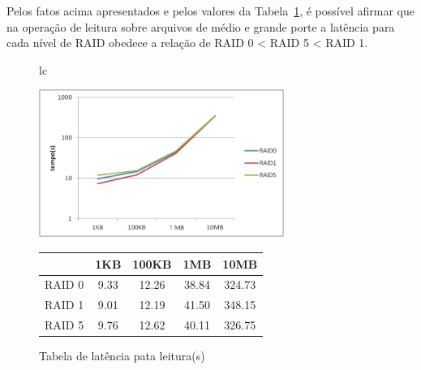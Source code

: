 	Pelos fatos acima apresentados e pelos valores da Tabela~\ref{tab:latencia_l}, é possível afirmar que na operação de leitura sobre arquivos de médio e grande porte a latência para cada nível de RAID obedece a relação de RAID 0 < RAID 5 < RAID 1.
	\\
	
	\begin{figure}[h]
		\begin{tabular}{lc}
			\begin{minipage}{.50\textwidth}
				\begin{center}
					
					\includegraphics[clip,width=8.0cm]{images/resultados/latencia_leitura.png}
					\caption{Gráfico de latência pata leitura}
					\label{fig:latencia_l}
					
				\end{center}
				
			\end{minipage}
			
			\begin{minipage}{.5\textwidth}
				\makeatletter
				\def\@captype{table}
				\makeatother
				\caption{Tabela de latência pata leitura(s)}
				\label{tab:latencia_l}
				\begin{center}
					\begin{tabular}{|c|c|c|c|c|} \hline
								& 1KB  & 100KB & 1MB   & 10MB  \\ \hline
						RAID 0	& 9.33 & 12.26 & 38.84 & 324.73\\ \hline
						RAID 1	& 9.01 & 12.19 & 41.50 & 348.15\\ \hline
						RAID 5	& 9.76 & 12.62 & 40.11 & 326.75\\ \hline
						
						
					\end{tabular}
				\end{center}
				
			\end{minipage}
		\end{tabular}
	\end{figure}
	
